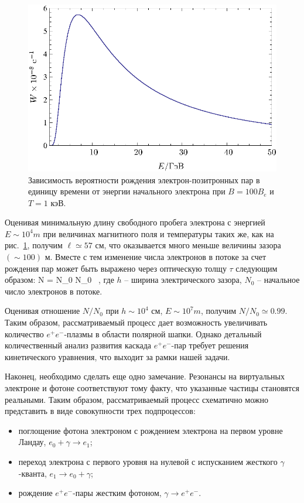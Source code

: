 %
\begin{figure}[h]
\centerline{\includegraphics[width=14cm]{fig5_5.eps}}
\caption{Зависимость вероятности рождения электрон-позитронных пар в единицу времени от энергии 
начального электрона  при $B=100B_e$ и $T=1$ кэВ.}
\label{fig:prob}
\end{figure}

Оценивая минимальную длину свободного пробега электрона 
с энергией $E \sim 10^{4} m$ при величинах  
магнитного поля и температуры таких же, как на рис.~\ref{fig:prob}, получим 
$\ell \simeq 57$ см, что 
оказывается много меньше величины зазора $(\sim 100)$ м.  
Вместе с тем изменение числа электронов в потоке за счет рождения пар может быть 
выражено через оптическую толщу $\tau$ следующим образом: 
%
\beq
\label{eq:tau}
N = N_0 \exp{[-\tau]} \simeq N_0  \, , 
\eeq
\noindent где  $h$ -- ширина электрического зазора, 
$N_0$ -- начальное число электронов в потоке.

Оценивая отношение $N/N_0$ при $h \sim 10^4$ см, $E \sim 10^{7} m$, 
получим $N/N_0 \simeq 0.99$. Таким образом, рассматриваемый 
процесс дает возможность  увеличивать количество $e^+e^-$-плазмы в области 
полярной шапки. Однако детальный количественный анализ 
развития каскада  $e^+e^-$-пар требует 
решения кинетического уравнения, что выходит за рамки нашей задачи.

Наконец, необходимо сделать еще одно замечание.  Резонансы 
на виртуальных электроне и 
фотоне соответствуют тому факту, что указанные частицы становятся 
реальными. Таким образом,  
рассматриваемый процесс схематично можно представить в виде совокупности трех 
подпроцессов: 
\begin{itemize}
\item
поглощение фотона электроном с рождением электрона на первом уровне Ландау, $e_0+\gamma \to e_1$; 

\item
переход электрона с первого уровня на нулевой с испусканием жесткого $\gamma$-кванта, 
$e_1 \to e_0 + \gamma$;

\item
рождение $e^+e^-$-пары жестким фотоном, $\gamma \to e^+e^-$.

\end{itemize}


